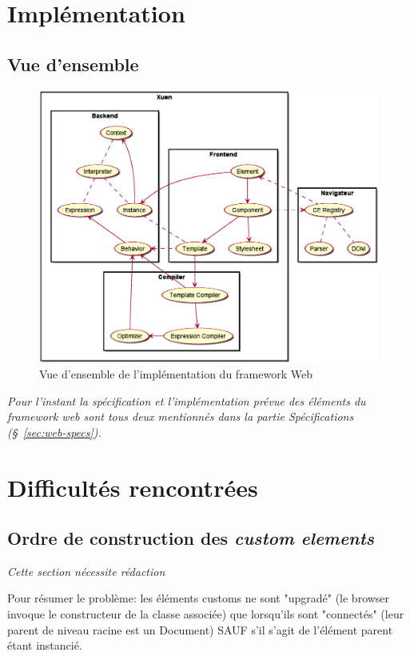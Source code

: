\section{Implémentation}

\subsection{Vue d'ensemble}
\begin{figure}[h]
	\centering
	\includegraphics[width=\textwidth]{img/web_overview.eps}
	\caption{Vue d'ensemble de l'implémentation du framework Web}
	\label{fig:web-overview}
\end{figure}

\textit{Pour l'instant la spécification et l'implémentation prévue des éléments du framework web sont tous deux mentionnés dans la partie Spécifications (§~\ref{sec:web-specs}).}

\newpage
\section{Difficultés rencontrées}
\subsection{Ordre de construction des \emph{custom elements}}

\textit{Cette section nécessite rédaction}

Pour résumer le problème: les éléments customs ne sont "upgradé" (le browser invoque le constructeur de la classe associée) que lorsqu'ils sont "connectés" (leur parent de niveau racine est un Document) SAUF s'il s'agit de l'élément parent étant instancié.

